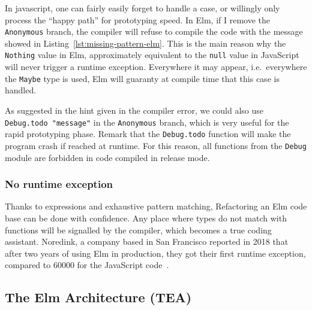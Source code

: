 

In javascript, one can fairly easily forget to handle a case,
or willingly only process the ``happy path'' for prototyping speed.
In Elm, if I remove the \verb|Anonymous| branch,
the compiler will refuse to compile the code
with the message showed in Listing~\ref{lst:missing-pattern-elm}.
This is the main reason why the \verb|Nothing| value in Elm,
approximately equivalent to the \verb|null| value in JavaScript
will never trigger a runtime exception.
Everywhere it may appear, i.e.\ everywhere the \verb|Maybe| type is used,
Elm will guaranty at compile time that this case is handled.



As suggested in the hint given in the compiler error,
we could also use \verb|Debug.todo "message"| in the \verb|Anonymous| branch,
which is very useful for the rapid prototyping phase.
Remark that the \verb|Debug.todo| function will make the program crash
if reached at runtime.
For this reason, all functions from the \verb|Debug| module
are forbidden in code compiled in release mode.


\subsubsection{No runtime exception}%
\label{ssub:no_runtime_exception}

Thanks to expressions and exhaustive pattern matching,
Refactoring an Elm code base can be done with confidence.
Any place where types do not match with functions
will be signalled by the compiler, which becomes a true coding assistant.
Noredink, a company based in San Francisco reported in 2018 that after
two years of using Elm in production,
they got their first runtime exception,
compared to 60000 for the JavaScript code~\cite{zeroruntimeerror}.


\subsection{The Elm Architecture (TEA)}%
\label{sub:the_elm_architecture_tea_}

